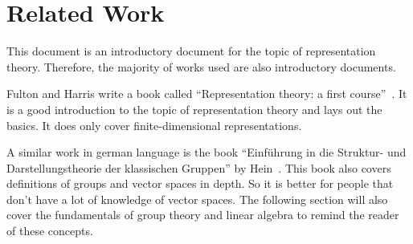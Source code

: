\section{Related Work}

This document is an introductory document for the topic of representation theory.
Therefore, the majority of works used are also introductory documents.

Fulton and Harris write a book called ``Representation theory: a first course''~\cite{fulton2013}.
It is a good introduction to the topic of representation theory and lays out the basics.
It does only cover finite-dimensional representations.

A similar work in german language is the book ``Einführung in die Struktur- und Darstellungstheorie der klassischen Gruppen'' by Hein~\cite{hein2013}.
This book also covers definitions of groups and vector spaces in depth.
So it is better for people that don't have a lot of knowledge of vector spaces.
The following section will also cover the fundamentals of group theory and linear algebra to remind the reader of these concepts.
